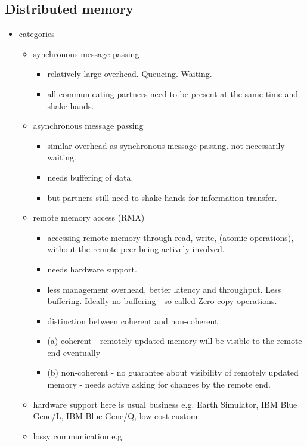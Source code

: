 \documentclass[a4paper, 10pt]{article}
\begin{document}
\subsection{Distributed memory}
\begin{itemize}
	\item categories
		\begin{itemize}
			\item synchronous message passing
				\begin{itemize}
					\item relatively large overhead. Queueing. Waiting.
					\item all communicating partners need to be present at the same time and shake hands.
				\end{itemize}
			\item asynchronous message passing
				\begin{itemize}
					\item similar overhead as synchronous message passing. not necessarily waiting.
					\item needs buffering of data.
					\item but partners still need to shake hands for information transfer.
				\end{itemize}
			\item remote memory access (RMA)
				\begin{itemize}
					\item accessing remote memory through read, write, (atomic operations), without the remote peer being actively involved.
					\item needs hardware support.
					\item less management overhead, better latency and throughput. Less buffering. Ideally no buffering - so called Zero-copy operations.
					\item distinction between coherent and non-coherent
					\item (a) coherent - remotely updated memory will be visible to the remote end eventually
					\item (b) non-coherent - no guarantee about visibility of remotely updated memory - needs active asking for changes by the remote end.
				\end{itemize}
			\item hardware support here is usual business e.g. Earth Simulator\cite{earthsimulator}, IBM Blue Gene/L\cite{bluegenel}, IBM Blue Gene/Q\cite{bluegeneq}, low-cost custom\cite{hoefler2006b}
			\item lossy communication e.g.

\end{itemize}
\end{itemize}
\end{document}
